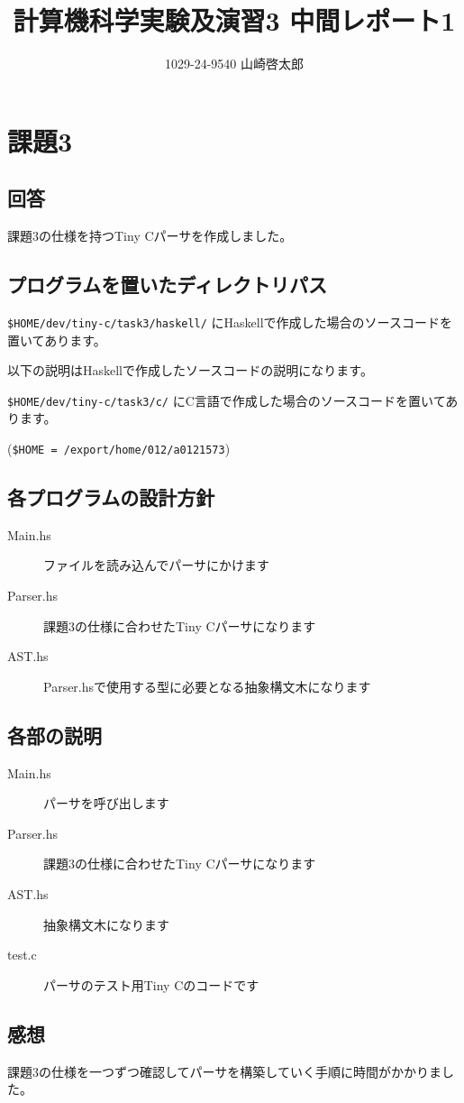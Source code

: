 \documentclass[a4paper,12pt]{jarticle}
\title{計算機科学実験及演習3 中間レポート1}
\author{1029-24-9540 山崎啓太郎}
\begin{document}
\lstset{numbers=left,basicstyle=\small}
\maketitle

\section{課題3}
\subsection{回答}
課題3の仕様を持つTiny Cパーサを作成しました。

\subsection{プログラムを置いたディレクトリパス}
\verb|$HOME/dev/tiny-c/task3/haskell/| にHaskellで作成した場合のソースコードを置いてあります。

以下の説明はHaskellで作成したソースコードの説明になります。

\verb|$HOME/dev/tiny-c/task3/c/| にC言語で作成した場合のソースコードを置いてあります。

(\verb|$HOME = /export/home/012/a0121573|)

\subsection{各プログラムの設計方針}

\begin{description}
  \item[Main.hs] ファイルを読み込んでパーサにかけます
  \item[Parser.hs] 課題3の仕様に合わせたTiny Cパーサになります
  \item[AST.hs] Parser.hsで使用する型に必要となる抽象構文木になります
\end{description}

\subsection{各部の説明}

\begin{description}
  \item[Main.hs] パーサを呼び出します
  \item[Parser.hs] 課題3の仕様に合わせたTiny Cパーサになります
  \item[AST.hs] 抽象構文木になります
  \item[test.c] パーサのテスト用Tiny Cのコードです
\end{description}

\subsection{感想}
課題3の仕様を一つずつ確認してパーサを構築していく手順に時間がかかりました。
\end{document}
